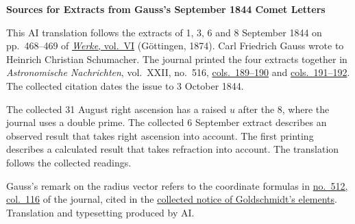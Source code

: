 \clearpage\thispagestyle{empty}
\begin{center}\textbf{Sources for Extracts from Gauss’s September 1844 Comet Letters}\end{center}
\noindent This AI translation follows the extracts of 1, 3, 6 and 8 September 1844 on pp.~468--469 of \href{https://gdz.sub.uni-goettingen.de/id/PPN236007467}{\textit{Werke}, vol.~VI} (Göttingen, 1874). Carl Friedrich Gauss wrote to Heinrich Christian Schumacher. The journal printed the four extracts together in \textit{Astronomische Nachrichten}, vol.~XXII, no.~516, \href{https://api.digitale-sammlungen.de/iiif/image/v2/bsb10049447_00103/full/1800,/0/default.jpg}{cols.~189--190} and \href{https://api.digitale-sammlungen.de/iiif/image/v2/bsb10049447_00104/full/1800,/0/default.jpg}{cols.~191--192}. The collected citation dates the issue to 3 October 1844.
\par\smallskip\noindent The collected 31 August right ascension has a raised \(u\) after the 8, where the journal uses a double prime. The collected 6 September extract describes an observed result that takes right ascension into account. The first printing describes a calculated result that takes refraction into account. The translation follows the collected readings.
\par\smallskip\noindent Gauss’s remark on the radius vector refers to the coordinate formulas in \href{https://api.digitale-sammlungen.de/iiif/image/v2/bsb10049447_00066/full/1800,/0/default.jpg}{no.~512, col.~116} of the journal, cited in the \hyperlink{native-472-notice}{collected notice of Goldschmidt’s elements}. Translation and typesetting produced by AI.
\clearpage
